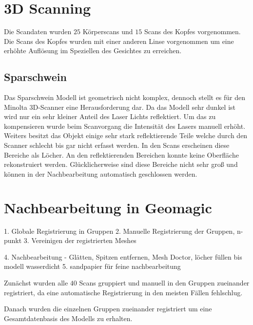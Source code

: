 \documentclass[]{article}
\begin{document}
\section{3D Scanning} %

Die Scandaten wurden $25$ Körperscans und $15$ Scans des Kopfes vorgenommen.
Die Scans des Kopfes wurden mit einer anderen Linse vorgenommen um eine erhöhte Auflösung im Speziellen des Gesichtes zu erreichen.

\subsection{}
\subsection{}
\subsection{Sparschwein}
Das Sparschwein Modell ist geometrisch nicht komplex, dennoch stellt es für den Minolta 3D-Scanner eine Herausforderung dar. Da das Modell sehr dunkel ist wird  nur ein sehr kleiner Anteil des Laser Lichts reflektiert. Um das zu kompensieren wurde beim Scanvorgang die Intensität des Lasers manuell erhöht. Weiters besitzt das Objekt einige sehr stark reflektierende Teile welche durch den Scanner schlecht bis gar nicht erfasst werden. In den Scans erscheinen diese Bereiche als Löcher. An den reflektierenden Bereichen konnte keine Oberfläche rekonstruiert werden. Glücklicherweise sind diese Bereiche nicht sehr groß und können in der Nachbearbeitung automatisch geschlossen werden.

\section{Nachbearbeitung in Geomagic} %

1. Globale Registrierung in Gruppen
2. Manuelle Registrierung der Gruppen, n-punkt
3. Vereinigen der registrierten Meshes

4. Nachbearbeitung
- Glätten, Spitzen entfernen, Mesh Doctor, löcher füllen
bis modell wasserdicht
5. sandpapier für feine nachbearbeitung


Zunächst wurden alle $40$ Scans gruppiert und manuell in den Gruppen zueinander registriert, da eine automatische Registrierung in den meisten Fällen fehlschlug.

Danach wurden die einzelnen Gruppen zueinander registriert um eine Gesamtdatenbasis des Modells zu erhalten.
\end{document}
